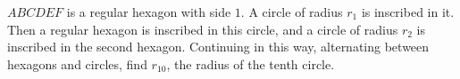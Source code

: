 $ABCDEF$ is a regular hexagon with side $1$. A circle of radius $r_1$ is inscribed in it. Then a regular hexagon is inscribed in this circle, and a circle of radius $r_2$ is inscribed in the second hexagon. Continuing in this way, alternating between hexagons and circles, find $r_{10}$, the radius of the tenth circle.
